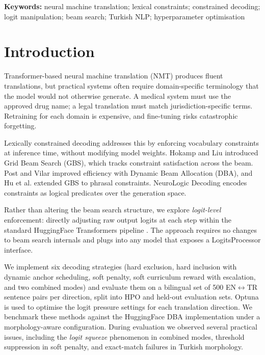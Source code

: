 \documentclass{CUP-JNL-NLP}
\begin{document}
\noindent\textbf{Keywords:} neural machine translation; lexical constraints;
constrained decoding; logit manipulation; beam search; Turkish NLP;
hyperparameter optimisation

\section{Introduction}

Transformer-based neural machine translation (NMT) \citep{vaswani2017attention}
produces fluent translations, but practical systems often require domain-specific
terminology that the model would not otherwise generate. A medical system must use
the approved drug name; a legal translation must match jurisdiction-specific terms.
Retraining for each domain is expensive, and fine-tuning risks catastrophic
forgetting.

Lexically constrained decoding addresses this by enforcing vocabulary constraints at
inference time, without modifying model weights. Hokamp and Liu
\citeyearpar{hokamp2017lexically} introduced Grid Beam Search (GBS), which tracks
constraint satisfaction across the beam. Post and Vilar \citeyearpar{post2018fast}
improved efficiency with Dynamic Beam Allocation (DBA), and Hu et al.
\citeyearpar{hu2019improved} extended GBS to phrasal constraints. NeuroLogic
Decoding \citep{lu2021neurologic} encodes constraints as logical predicates over
the generation space.

Rather than altering the beam search structure, we explore \emph{logit-level}
enforcement: directly adjusting raw output logits at each step within the standard
HuggingFace Transformers pipeline \citep{wolf2020transformers}. The approach
requires no changes to beam search internals and plugs into any model that exposes
a LogitsProcessor interface.

We implement six decoding strategies (hard exclusion, hard inclusion with dynamic
anchor scheduling, soft penalty, soft curriculum reward with escalation, and two
combined modes) and evaluate them on a bilingual set of 500 EN$\leftrightarrow$TR
sentence pairs per direction, split into HPO and held-out evaluation sets. Optuna
\citep{akiba2019optuna} is used to optimise the logit pressure settings for each
translation direction. We benchmark these methods against the HuggingFace DBA
implementation under a morphology-aware configuration. During evaluation we observed
several practical issues, including the \emph{logit squeeze} phenomenon in combined
modes, threshold suppression in soft penalty, and exact-match failures in Turkish
morphology.
\end{document}
